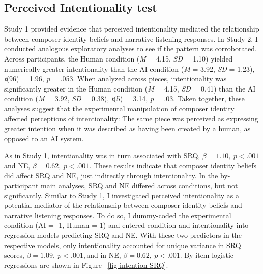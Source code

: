 \documentclass[12pt,twoside]{reedthesis}
\begin{document}
\subsection*{Perceived Intentionality test}
Study 1 provided evidence that perceived intentionality mediated the relationship between composer identity beliefs and narrative listening responses. In Study 2, I conducted analogous exploratory analyses to see if the pattern was corroborated. Across participants, the Human condition (\emph{M} = 4.15, \emph{SD} = 1.10) yielded numerically greater intentionality than the AI condition (\emph{M} = 3.92, \emph{SD} = 1.23), \emph{t}(96) = 1.96, \emph{p} = .053. When analyzed across pieces, intentionality was significantly greater in the Human condition (\emph{M} = 4.15, \emph{SD}  = 0.41) than the AI condition (\emph{M} = 3.92, \emph{SD} = 0.38), \emph{t}(5) = 3.14, \emph{p} = .03. Taken together, these analyses suggest that the experimental manipulation of composer identity affected perceptions of intentionality: The same piece was perceived as expressing greater intention when it was described as having been created by a human, as opposed to an AI system. 

As in Study 1, intentionality was in turn associated with SRQ, $\beta = 1.10, \:p < .001$ and NE, $ \beta = 0.62, \:p < .001$. These results indicate that composer identity beliefs did affect SRQ and NE, just indirectly through intentionality.
In the by-participant main analyses, SRQ and NE differed across conditions, but not significantly. Similar to Study 1, I investigated perceived intentionality as a potential mediator of the relationship between composer identity beliefs and narrative listening responses. To do so, I dummy-coded the experimental condition (AI = -1, Human = 1) and entered condition and intentionality into regression models predicting SRQ and NE. With these two predictors in the respective models, only intentionality accounted for unique variance in SRQ scores, $\beta = 1.09, \:p < .001, $and in NE, $ \beta = 0.62, \:p < .001$. By-item logistic regressions are shown in Figure ~\ref*{fig-intention-SRQ}.
\end{document}
